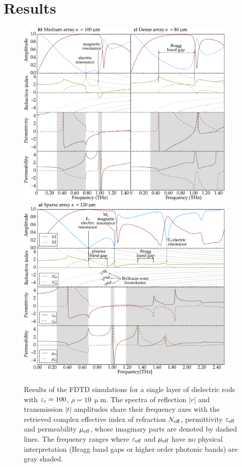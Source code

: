 {\section{Results}
\begin{figure} \centering
\includegraphics[angle=270,width=105mm]{img/ERods_eps100_double_a100a080_FDTD.pdf}
\includegraphics[angle=270,width=105mm]{img/ERods_eps100_single_a120_FDTD.pdf}
\caption{Results of the FDTD simulations for a single layer of dielectric rods with $\varepsilon_{\rm r}= 100$,
$\rho=10$\,$\upmu$m. The spectra of reflection $|r|$ and transmission $|t|$ amplitudes share
their frequency axes with the retrieved complex effective index of refraction $N_{\text{eff} }$,
permittivity $\varepsilon_{\text{eff} }$ and permeability $\mu_{\text{eff} }$, whose imaginary parts are denoted by
dashed lines. The frequency ranges where $\varepsilon_{\text{eff} }$ and $\mu_{\text{eff} }$ have no physical
interpretation (Bragg band gaps or higher order photonic bands) are gray shaded.  } \label{fg_spec}
\end{figure}

}
